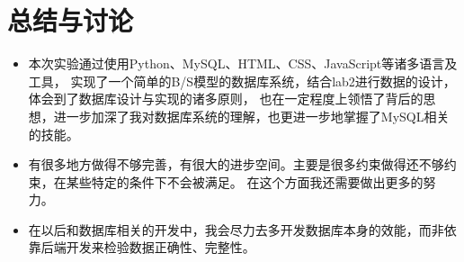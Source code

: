 \documentclass{article}
\begin{document}
    \section{总结与讨论}
    \begin{itemize}
        \item 本次实验通过使用Python、MySQL、HTML、CSS、JavaScript等诸多语言及工具，
        实现了一个简单的B/S模型的数据库系统，结合lab2进行数据的设计，体会到了数据库设计与实现的诸多原则，
        也在一定程度上领悟了背后的思想，进一步加深了我对数据库系统的理解，也更进一步地掌握了MySQL相关的技能。
        \item 有很多地方做得不够完善，有很大的进步空间。主要是很多约束做得还不够约束，在某些特定的条件下不会被满足。
        在这个方面我还需要做出更多的努力。
        \item 在以后和数据库相关的开发中，我会尽力去多开发数据库本身的效能，而非依靠后端开发来检验数据正确性、完整性。
    \end{itemize}
    
\end{document}
